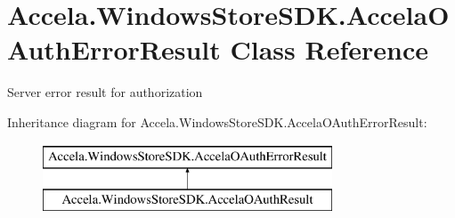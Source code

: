 \hypertarget{class_accela_1_1_windows_store_s_d_k_1_1_accela_o_auth_error_result}{\section{Accela.\+Windows\+Store\+S\+D\+K.\+Accela\+O\+Auth\+Error\+Result Class Reference}
\label{class_accela_1_1_windows_store_s_d_k_1_1_accela_o_auth_error_result}
}


Server error result for authorization  


Inheritance diagram for Accela.\+Windows\+Store\+S\+D\+K.\+Accela\+O\+Auth\+Error\+Result\+:\begin{figure}[H]
\begin{center}
\leavevmode
\includegraphics[height=2.000000cm]{class_accela_1_1_windows_store_s_d_k_1_1_accela_o_auth_error_result}
\end{center}
\end{figure}
